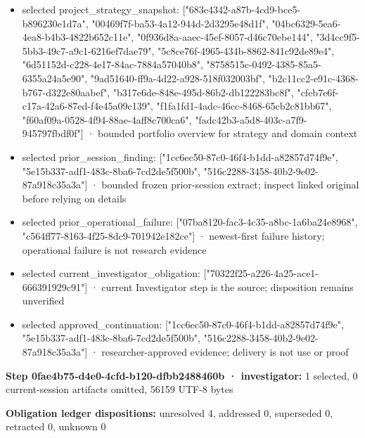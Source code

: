 \documentclass[11pt]{article}
\begin{document}
\begin{itemize}
\item selected project\_strategy\_snapshot: ["683e4342-a87b-4cd9-bce5-b896230e1d7a", "00469f7f-ba53-4a12-944d-2d3295e48d1f", "04bc6329-5ea6-4ea8-b4b3-4822b652c11e", "0f936d8a-aaec-45ef-8057-d46c70ebe144", "3d4cc9f5-5bb3-49c7-a9c1-6216ef7dae79", "5c8ce76f-4965-434b-8862-841c92de89e4", "6d51152d-c228-4e17-84ac-7884a57040b8", "8758515c-0492-4385-85a5-6355a24a5e90", "9ad51640-ff9a-4d22-a928-518f032003bf", "b2c11cc2-e91c-4368-b767-d322e80aabef", "b317e6de-848e-495d-86b2-db122283bc8f", "cfeb7e6f-c17a-42a6-87ed-f4e45a09c139", "f1fa1fd1-4adc-46cc-8468-65cb2c81bb67", "f60af09a-0528-4f94-88ae-4aff8c700ca6", "fadc42b3-a5d8-403c-a7f9-945797fbdf0f"] · bounded portfolio overview for strategy and domain context
\item selected prior\_session\_finding: ["1cc6ec50-87c0-46f4-b1dd-a82857d74f9e", "5e15b337-adf1-483c-8ba6-7cd2de5f500b", "516c2288-3458-40b2-9e02-87a918c35a3a"] · bounded frozen prior-session extract; inspect linked original before relying on details
\item selected prior\_operational\_failure: ["07ba8120-fac3-4c35-a8bc-1a6ba24e8968", "c564ff77-8163-4f25-8dc9-701942e182ce"] · newest-first failure history; operational failure is not research evidence
\item selected current\_investigator\_obligation: ["70322f25-a226-4a25-ace1-666391929c91"] · current Investigator step is the source; disposition remains unverified
\item selected approved\_continuation: ["1cc6ec50-87c0-46f4-b1dd-a82857d74f9e", "5e15b337-adf1-483c-8ba6-7cd2de5f500b", "516c2288-3458-40b2-9e02-87a918c35a3a"] · researcher-approved evidence; delivery is not use or proof
\end{itemize}
\textbf{Step 0fae4b75-d4e0-4cfd-b120-dfbb2488460b · investigator:} 1 selected, 0 current-session artifacts omitted, 56159 UTF-8 bytes\par
\textbf{Obligation ledger dispositions:} unresolved 4, addressed 0, superseded 0, retracted 0, unknown 0\par
\end{document}
